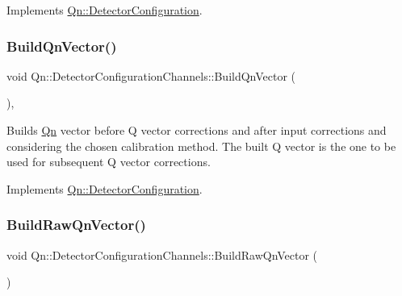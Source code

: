 Implements \mbox{\hyperlink{classQn_1_1DetectorConfiguration_a512c77d73e0e6453607f7ae7e2e8f72b}{Qn\+::\+Detector\+Configuration}}.

\mbox{\label{classQn_1_1DetectorConfigurationChannels_aa68804ba67cf6fdee8891e6aed0e14f7}} 
\subsubsection{\texorpdfstring{Build\+Qn\+Vector()}{BuildQnVector()}}
{\footnotesize\ttfamily void Qn\+::\+Detector\+Configuration\+Channels\+::\+Build\+Qn\+Vector (\begin{DoxyParamCaption}{ }\end{DoxyParamCaption})\hspace{0.3cm}{\ttfamily [inline]}, {\ttfamily [virtual]}}

Builds \mbox{\hyperlink{namespaceQn}{Qn}} vector before Q vector corrections and after input corrections and considering the chosen calibration method. The built Q vector is the one to be used for subsequent Q vector corrections. 

Implements \mbox{\hyperlink{classQn_1_1DetectorConfiguration_a7aaf10f6e30151dd142d59d5dff72e2d}{Qn\+::\+Detector\+Configuration}}.

\mbox{\label{classQn_1_1DetectorConfigurationChannels_a6770ab3360c5e688c30bbea0522f3856}} 
\subsubsection{\texorpdfstring{Build\+Raw\+Qn\+Vector()}{BuildRawQnVector()}}
{\footnotesize\ttfamily void Qn\+::\+Detector\+Configuration\+Channels\+::\+Build\+Raw\+Qn\+Vector (\begin{DoxyParamCaption}{ }\end{DoxyParamCaption})\hspace{0.3cm}{\ttfamily [inline]}}

